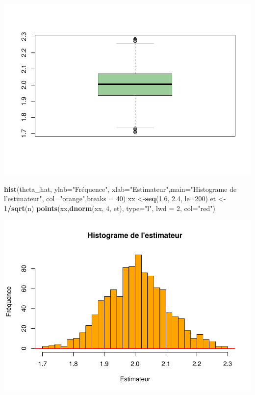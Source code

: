 \documentclass[]{article}
\newenvironment{Shaded}{\begin{snugshade}}{\end{snugshade}}
\newcommand{\DataTypeTok}[1]{\textcolor[rgb]{0.13,0.29,0.53}{#1}}
\newcommand{\DecValTok}[1]{\textcolor[rgb]{0.00,0.00,0.81}{#1}}
\newcommand{\FloatTok}[1]{\textcolor[rgb]{0.00,0.00,0.81}{#1}}
\newcommand{\KeywordTok}[1]{\textcolor[rgb]{0.13,0.29,0.53}{\textbf{#1}}}
\newcommand{\NormalTok}[1]{#1}
\newcommand{\OperatorTok}[1]{\textcolor[rgb]{0.81,0.36,0.00}{\textbf{#1}}}
\newcommand{\StringTok}[1]{\textcolor[rgb]{0.31,0.60,0.02}{#1}}
\begin{document}
\includegraphics{durand_eltarr_files/figure-latex/unnamed-chunk-31-1.pdf}

\begin{Shaded}
\begin{Highlighting}[]
\KeywordTok{hist}\NormalTok{(theta_hat, }\DataTypeTok{ylab=}\StringTok{"Fréquence"}\NormalTok{, }\DataTypeTok{xlab=}\StringTok{"Estimateur"}\NormalTok{,}\DataTypeTok{main=}\StringTok{"Histograme de l'estimateur"}\NormalTok{, }\DataTypeTok{col=}\StringTok{"orange"}\NormalTok{,}\DataTypeTok{breaks =} \DecValTok{40}\NormalTok{)}
\NormalTok{xx <-}\KeywordTok{seq}\NormalTok{(}\FloatTok{1.6}\NormalTok{, }\FloatTok{2.4}\NormalTok{, }\DataTypeTok{le=}\DecValTok{200}\NormalTok{)}
\NormalTok{et <-}\StringTok{ }\DecValTok{1}\OperatorTok{/}\KeywordTok{sqrt}\NormalTok{(n)}
\KeywordTok{points}\NormalTok{(xx,}\KeywordTok{dnorm}\NormalTok{(xx, }\DecValTok{4}\NormalTok{, et), }\DataTypeTok{type=}\StringTok{"l"}\NormalTok{, }\DataTypeTok{lwd =} \DecValTok{2}\NormalTok{, }\DataTypeTok{col=}\StringTok{"red"}\NormalTok{)}
\end{Highlighting}
\end{Shaded}

\includegraphics{durand_eltarr_files/figure-latex/unnamed-chunk-31-2.pdf}
\end{document}

